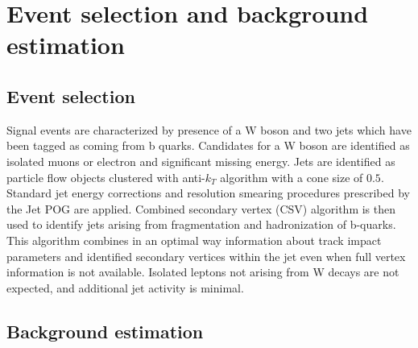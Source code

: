 
\chapter{Event selection and background estimation} %

\label{Chapter6} %





\section{Event selection}
\label{sec:selection}
Signal events are characterized by presence of a W boson and two jets which have been tagged as coming from b quarks.
Candidates for a W boson are identified as isolated muons or electron and significant missing energy.
Jets are identified as particle flow objects clustered with anti-$k_T$ algorithm with a cone size of $0.5$.
Standard jet energy corrections and resolution smearing procedures prescribed by the Jet POG are applied.
Combined secondary vertex (CSV) algorithm is then used to identify jets arising from fragmentation and hadronization of b-quarks.
This algorithm combines in an optimal way information about track impact parameters and identified secondary vertices
within the jet even when full vertex information is not available.
Isolated leptons not arising from W decays are not expected, and additional jet activity is minimal.





\section{Background estimation}

